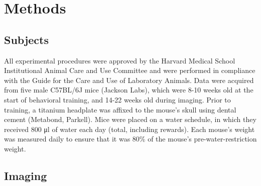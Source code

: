 \chapter{Methods} \label{sec:methods}

\section{Subjects} \label{methods:subjects}
All experimental procedures were approved by the Harvard Medical School Institutional Animal Care and Use Committee and were performed in compliance with the Guide for the Care and Use of Laboratory Animals. Data were acquired from five male C57BL/6J mice (Jackson Labs), which were 8-10 weeks old at the start of behavioral training, and 14-22 weeks old during imaging. Prior to training, a titanium headplate was affixed to the mouse’s skull using dental cement (Metabond, Parkell). Mice were placed on a water schedule, in which they received 800 μl of water each day (total, including rewards).  Each mouse’s weight was measured daily to ensure that it was  80\% of the mouse’s pre-water-restriction weight.  

\section{Imaging} \label{methods:imaging}
